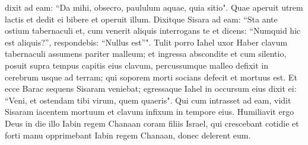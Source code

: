 \begin{biblechapter}
\verse dixit ad eam: “Da mihi, obsecro, paululum aquae, quia sitio". Quae aperuit utrem lactis et dedit ei bibere et operuit illum. 
\verse Dixitque Sisara ad eam: “Sta ante ostium tabernaculi et, cum venerit aliquis interrogans te et dicens: “Numquid hic est aliquis?”, respondebis: “Nullus est”". 
\verse Tulit porro Iahel uxor Haber clavum tabernaculi assumens pariter malleum; et ingressa abscondite et cum silentio, posuit supra tempus capitis eius clavum, percussumque malleo defixit in cerebrum usque ad terram; qui soporem morti socians defecit et mortuus est. 
\verse Et ecce Barac sequens Sisaram veniebat; egressaque Iahel in occursum eius dixit ei: “Veni, et ostendam tibi virum, quem quaeris". Qui cum intrasset ad eam, vidit Sisaram iacentem mortuum et clavum infixum in tempore eius. 
\verse Humiliavit ergo Deus in die illo Iabin regem Chanaan coram filiis Israel,  
\verse qui crescebant cotidie et forti manu opprimebant Iabin regem Chanaan, donec delerent eum. 
\end{biblechapter}

